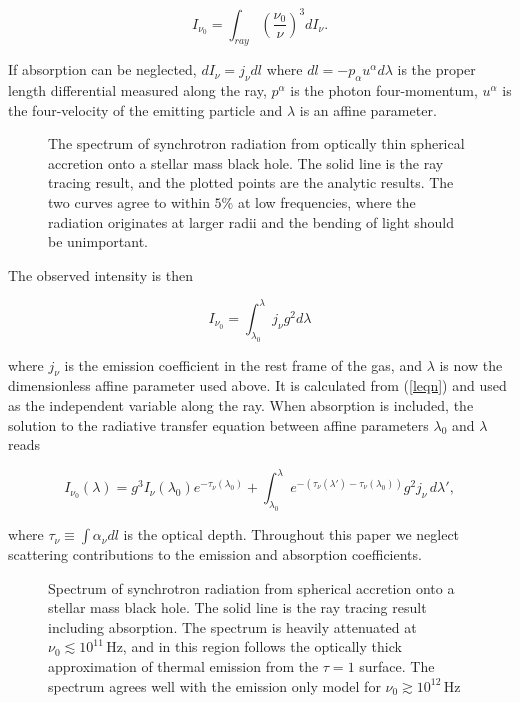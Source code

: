 \documentclass[apj]{emulateapj}
\begin{document}
\begin{equation}\label{dintense}
I_{\nu_0} = \int_{ray} \left ( \frac{\nu_0}{\nu} \right )^3 dI_\nu.
\end{equation}

If absorption can be neglected, $dI_\nu = j_\nu dl$ where $dl =  -p_\alpha u^\alpha d\lambda$ is the proper length differential measured along the ray, $p^\alpha$ is the photon four-momentum, $u^\alpha$ is the four-velocity of the emitting particle and $\lambda$ is an affine parameter.

\begin{figure}
\caption{\label{tracecompare}The spectrum of synchrotron radiation from optically thin spherical accretion onto a stellar mass black hole. The solid line is the ray tracing result, and the plotted points are the analytic results. The two curves agree to within $5\%$ at low frequencies, where the radiation originates at larger radii and the bending of light should be unimportant.}
\end{figure}

The observed intensity is then

\begin{equation}
 I_{\nu_0} = \int_{\lambda_0}^{\lambda} j_\nu g^2 d \lambda
\end{equation}

\noindent where $j_\nu$ is the emission coefficient in the rest frame of the gas, and $\lambda$ is now the dimensionless affine parameter used above. It is calculated from (\ref{leqn}) and used as the independent variable along the ray. When absorption is included, the solution to the radiative transfer equation between affine parameters $\lambda_0$ and $\lambda$ reads \citep{fuerstwu2004}

\begin{equation}\label{formalradtrans}
  I_{\nu_0}(\lambda) = g^3 I_\nu(\lambda_0) e^{-\tau_\nu(\lambda_0)} + \int_{\lambda_0}^{\lambda} e^{-(\tau_\nu(\lambda ') - \tau_\nu(\lambda_0))} g^2 j_{\nu} \hspace{2pt} d\lambda ',
\end{equation}

\noindent where $\tau_\nu \equiv \int \alpha_\nu dl$ is the optical depth. Throughout this paper we neglect scattering contributions to the emission and absorption coefficients.

\begin{figure}
\caption{\label{abscompare}Spectrum of synchrotron radiation from spherical accretion onto a stellar mass black hole. The solid line is the ray tracing result including absorption. The spectrum is heavily attenuated at $\nu_0 \lesssim 10^{11} \hspace{2pt} \mathrm{Hz}$, and in this region follows the optically thick approximation of thermal emission from the $\tau = 1$ surface. The spectrum agrees well with the emission only model for $\nu_0 \gtrsim 10^{12} \hspace{2pt} \mathrm{Hz}$}
\end{figure}
\end{document}
